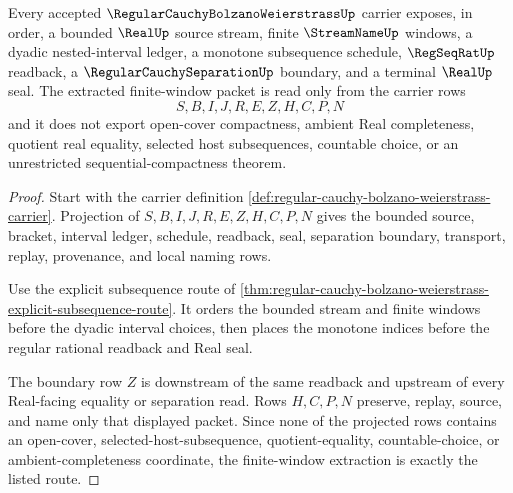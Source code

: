 \begin{theorem}
\label{thm:regular-cauchy-bolzano-weierstrass-finite-window-extraction}
Every accepted $\RegularCauchyBolzanoWeierstrassUp$ carrier exposes, in order, a bounded $\RealUp$ source stream, finite $\StreamNameUp$ windows, a dyadic nested-interval ledger, a monotone subsequence schedule, $\RegSeqRatUp$ readback, a $\RegularCauchySeparationUp$ boundary, and a terminal $\RealUp$ seal. The extracted finite-window packet is read only from the carrier rows
$$
S,B,I,J,R,E,Z,H,C,P,N
$$
and it does not export open-cover compactness, ambient Real completeness, quotient real equality, selected host subsequences, countable choice, or an unrestricted sequential-compactness theorem.
\end{theorem}
\begin{proof}
Start with the carrier definition \autoref{def:regular-cauchy-bolzano-weierstrass-carrier}. Projection of $S,B,I,J,R,E,Z,H,C,P,N$ gives the bounded source, bracket, interval ledger, schedule, readback, seal, separation boundary, transport, replay, provenance, and local naming rows.

Use the explicit subsequence route of \autoref{thm:regular-cauchy-bolzano-weierstrass-explicit-subsequence-route}. It orders the bounded stream and finite windows before the dyadic interval choices, then places the monotone indices before the regular rational readback and Real seal.

The boundary row $Z$ is downstream of the same readback and upstream of every Real-facing equality or separation read. Rows $H,C,P,N$ preserve, replay, source, and name only that displayed packet. Since none of the projected rows contains an open-cover, selected-host-subsequence, quotient-equality, countable-choice, or ambient-completeness coordinate, the finite-window extraction is exactly the listed route.
\end{proof}



